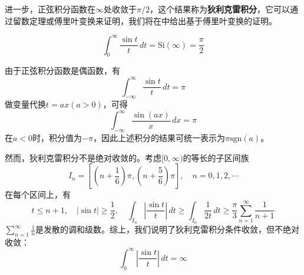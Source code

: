 进一步，正弦积分函数在$\infty$处收敛于$\pi/2$，这个结果称为\textbf{狄利克雷积分}，它可以通过留数定理或傅里叶变换来证明，我们将在中给出基于傅里叶变换的证明。
\begin{theorem}[狄利克雷积分]
    \label{thm:dirichlet_int}
    \[\int_{0}^{\infty}\frac{\sin t}{t}\,dt=\mathrm{Si}(\infty)=\frac{\pi}{2}\]
\end{theorem}

\begin{corollary}
    由于正弦积分函数是偶函数，有
    \[\int_{-\infty}^{\infty}\frac{\sin t}{t}\,dt=\pi\]
    做变量代换$t=ax(a>0)$，可得
    \[\int_{-\infty}^{\infty}\frac{\sin (ax)}{x}\,dx=\pi\]
    在$a<0$时，积分值为$-\pi$，因此上述积分的结果可统一表示为$\pi\mathrm{sgn}(a)$。
\end{corollary}

然而，狄利克雷积分不是绝对收敛的。考虑$[0,\infty)$的等长的子区间族
$$I_n=\left[\left(n+\frac{1}{6}\right)\pi,\left(n+\frac{5}{6}\right)\pi\right],\quad n=0,1,2,\cdots$$
在每个区间上，有
$$t\leq n+1,\quad |\sin t|\geq \frac{1}{2},\quad \int_{I_n}\left|\frac{\sin t}{t}\right|\,dt \geq \int_{I_n}\frac{1}{2t}\,dt\geq\frac{\pi}{3}\sum_{n=1}^{\infty}\frac{1}{n+1}$$
$\sum_{n=1}^{\infty}\frac{1}{n}$是发散的调和级数。综上，我们说明了狄利克雷积分条件收敛，但不绝对收敛：
$$\int_{0}^{\infty}\left|\frac{\sin t}{t}\right|\,dt=\infty$$




